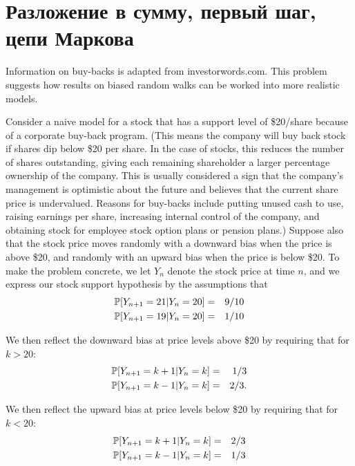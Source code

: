 \section{Разложение в сумму, первый шаг, цепи Маркова}




\begin{problem}
  Information on buy-backs is adapted from investorwords.com.
  This problem suggests how results on biased random walks
  can be worked into more realistic models.

  Consider a naive model for a stock that has a support level
  of \$20/share because of a corporate buy-back program.
  (This means the company will buy back stock if shares dip
  below \$20 per share.   In the case of stocks, this reduces
  the number of shares outstanding, giving each remaining
  shareholder a larger percentage ownership of the
  company. This is usually considered a sign that the
  company's management is optimistic about the future and
  believes that the current share price is
  undervalued. Reasons for buy-backs include putting unused
  cash to use, raising earnings per share, increasing internal
  control of the company, and obtaining stock for employee
  stock option plans or pension plans.)   Suppose also that the
  stock price moves randomly with a downward bias when the
  price is above \$20, and randomly with an upward bias when
  the price is below \$20.  To make the problem concrete, we
  let $Y_n$ denote the stock price at time $n$, and we express
  our stock support hypothesis by the assumptions that
  \begin{eqnarray*}
   \P[ Y_{n+1} = 21 | Y_{n} = 20] &=& 9/10 \\
   \P[ Y_{n+1} = 19 | Y_{n} = 20] &=& 1/10
  \end{eqnarray*}

  We then reflect the downward bias at price levels above
  \$20 by requiring that for $k > 20$:
  \begin{eqnarray*}
   \P[ Y_{n+1} = k+1 | Y_{n} = k ] &=& 1/3 \\
   \P[ Y_{n+1} = k-1 | Y_{n} = k ] &=& 2/3.
  \end{eqnarray*}

  We then reflect the upward bias at price levels below \$20
  by requiring that for $k < 20$:
  \begin{eqnarray*}
   \P[ Y_{n+1} = k+1 | Y_{n} = k ] &=& 2/3 \\
   \P[ Y_{n+1} = k-1 | Y_{n} = k ] &=& 1/3
  \end{eqnarray*}


\end{problem}
